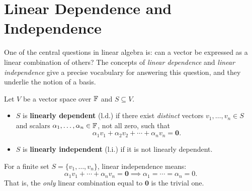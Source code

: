 \section{Linear Dependence and Independence}
\label{sec:lindep}

One of the central questions in linear algebra is: can a vector be expressed
as a linear combination of others?  The concepts of \emph{linear dependence}
and \emph{linear independence} give a precise vocabulary for answering this
question, and they underlie the notion of a basis.

\begin{defbox}
\label{def:lin-dep-indep}
Let $V$ be a vector space over $\mathbb{F}$ and $S\subseteq V$.

\begin{itemize}
    \item $S$ is \textbf{linearly dependent} (l.d.) if there exist
          \emph{distinct} vectors $v_1,\ldots,v_n\in S$ and scalars
          $\alpha_1,\ldots,\alpha_n\in\mathbb{F}$, not all zero, such that
          \[
              \alpha_1 v_1 + \alpha_2 v_2 + \cdots + \alpha_n v_n = \mathbf{0}.
          \]
    \item $S$ is \textbf{linearly independent} (l.i.) if it is not linearly
          dependent.
\end{itemize}
\end{defbox}

\begin{tipbox}
For a finite set $S=\{v_1,\ldots,v_n\}$, linear independence means:
\[
    \alpha_1 v_1 + \cdots + \alpha_n v_n = \mathbf{0}
    \implies \alpha_1 = \cdots = \alpha_n = 0.
\]
That is, the \emph{only} linear combination equal to $\mathbf{0}$ is the
trivial one.
\end{tipbox}

